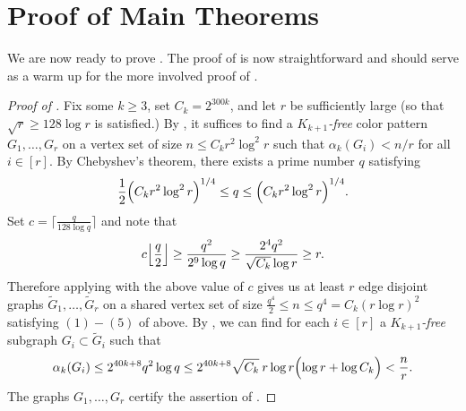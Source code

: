 \documentclass[12pt]{article}
\theoremstyle{definition}
\begin{document}
	\section{Proof of Main Theorems}\label{sec:graphs}
	We are now ready to prove . The proof of  is now straightforward and should serve as a warm up for the more involved proof of .
	
	

	
	
	\begin{proof}[Proof of ]
		Fix some $k \geq 3$, set $C_k=2^{300k}$, and let $r$ be sufficiently large (so that $\sqrt{r}\geq 128\log r$ is satisfied.) By , it suffices to find a $K_{k+1}$\textit{-free} color pattern $G_1,\dots,G_r$ on a vertex set of size $n\leq C_kr^2\log^2r$ such that $\alpha_k(G_i)<n/r$ for all $i \in [r]$. By Chebyshev's theorem, there exists a prime number $q$ satisfying \[\frac{1}{2}\Bigl(C_kr^2\log^2r\Bigr)^{1/4}\leq q \leq \Bigl( C_k r^2 \log^2r \Bigr)^{1/4}.\] Set $c=\lceil \frac{q}{128\log q}\rceil$ and note that 
		\[c\Bigl\lfloor\frac{q}{2}\Bigr \rfloor \geq \frac{q^2}{2^9 \log q} \geq \frac{2^4q^2}{\sqrt{C_k} \log r} \geq r.\]
		Therefore applying  with the above value of $c$ gives us at least $r$ edge disjoint graphs $\tilde{G}_1,\dots,\tilde{G}_r$ on a shared vertex set of size $\frac{q^4}{2}\leq n\leq q^4=C_k(r \log r)^2$ satisfying $(1)-(5)$ of  above. By , we can find for each $i \in [r]$ a $K_{k+1}$\textit{-free} subgraph $G_i \subset \tilde{G}_i$ such that
		\[\alpha_{k}(G_i) \leq 2^{40k+8}q^2 \log q \leq 2^{40k+8}\sqrt{C_k} \:r\log r \Bigl(\log r +\log C_k \Bigr)  < \frac{n}{r}. \]
		The graphs $G_1,\dots,G_r$ certify the assertion of .
	\end{proof}
	
\end{document}
